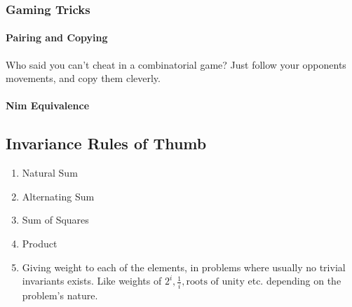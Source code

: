 		\newpage\subsubsection{Gaming Tricks}


			\paragraph{Pairing and Copying}

			{Who said you can't cheat in a combinatorial game? Just follow your opponents movements, and copy them cleverly.}


			\begin{enumerate}[wide=0em, label=\arabic*, itemsep=0pt, parsep=0pt, font=\footnotesize\bfseries]


			\end{enumerate}


			\paragraph{Nim Equivalence}





	\newpage\subsection{Invariance Rules of Thumb}\label{invariant_rules_of_thumb}

		\begin{enumerate}[wide=0em, label=\arabic*, itemsep=0pt, parsep=0pt, font=\footnotesize\bfseries]

			\item Natural Sum
			\item Alternating Sum
			\item Sum of Squares
			\item Product

			\item Giving weight to each of the elements, in problems where usually no trivial invariants exists. Like weights of $ 2^i, \frac{1}{i}, \text{roots of unity} $ etc. depending on the problem's nature.
		\end{enumerate}


